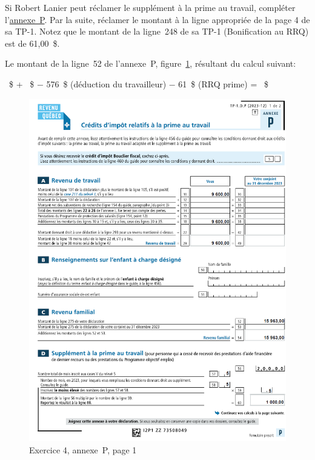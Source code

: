 \begin{sousQuestion}
	Si Robert Lanier peut réclamer le supplément à la prime au travail, compléter l'\href{https://www.revenuquebec.ca/documents/fr/formulaires/tp/2023-12/TP-1.D.P%282023-12%29.pdf}{annexe~P}. Par la suite, réclamer le montant à la ligne appropriée de la page 4 de sa TP-1.
	Notez que le montant de la ligne~248 de sa TP-1 (Bonification au RRQ) est de 61,00~\$.
\end{sousQuestion}
Le montant de la ligne~52 de l'annexe~P, figure~\ref{fig:chap7Exercice4AnnexePp1}, résultant du calcul suivant:
\begin{center}
	~\$ + ~\$ $-$ 576~\$ (déduction du travailleur) $-$ 61~\$ (RRQ prime) = ~\$
\end{center}
\begin{figure}
	\centering
	\includegraphics[width=.9\textwidth]{exercice/7-4/Q3/AnnexePp1.png}
	\caption[]{Exercice 4, annexe~P, page 1}
	\label{fig:chap7Exercice4AnnexePp1}
\end{figure}

